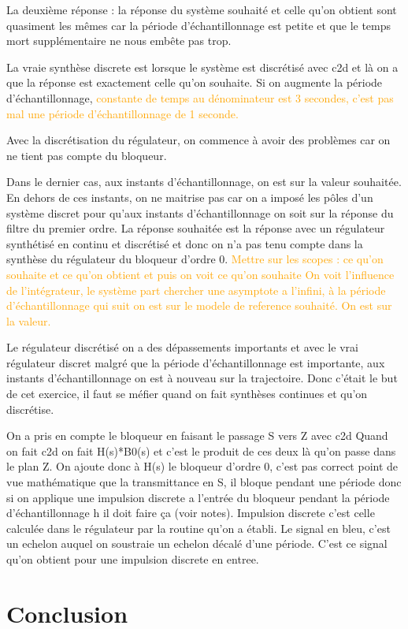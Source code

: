 La deuxième réponse : la réponse du système souhaité et celle qu’on obtient sont quasiment les mêmes car la période d’échantillonnage est petite et que le temps mort supplémentaire ne nous embête pas trop.

La vraie synthèse discrete est lorsque le système est discrétisé avec c2d et là on a que la réponse est exactement celle qu’on souhaite. Si on augmente la période d’échantillonnage, \textcolor{orange}{constante de temps au dénominateur est 3 secondes, c’est pas mal une période d’échantillonnage de 1 seconde.}

Avec la discrétisation du régulateur, on commence à avoir des problèmes car on ne tient pas compte du bloqueur.

Dans le dernier cas, aux instants d’échantillonnage, on est sur la valeur souhaitée. En dehors de ces instants, on ne maitrise pas car on a imposé les pôles d’un système discret pour qu’aux instants d’échantillonnage on soit sur la réponse du filtre du premier ordre.
La réponse souhaitée est la réponse avec un régulateur synthétisé en continu et discrétisé et donc on n'a pas tenu compte dans la synthèse du régulateur du bloqueur d’ordre 0.
\textcolor{orange}{Mettre sur les scopes : ce qu’on souhaite et ce qu’on obtient et puis on voit ce qu’on souhaite
On voit l’influence de l’intégrateur, le système part chercher une asymptote a l’infini, à la période d’échantillonnage qui suit on est sur le modele de reference souhaité. On est sur la valeur.}

Le régulateur discrétisé on a des dépassements importants et avec le vrai régulateur discret malgré que la période d’échantillonnage est importante, aux instants d’échantillonnage on est à nouveau sur la trajectoire. Donc c’était le but de cet exercice, il faut se méfier quand on fait synthèses continues et qu’on discrétise.

On a pris en compte le bloqueur en faisant le passage S vers Z avec c2d
Quand on fait c2d on fait H(s)*B0(s) et c’est le produit de ces deux là qu’on passe dans le plan Z. On ajoute donc à H(s) le bloqueur d’ordre 0, c’est pas correct point de vue mathématique que la transmittance en S, il bloque pendant une période donc si on applique une impulsion discrete a l’entrée du bloqueur pendant la période d’échantillonnage h il doit faire ça (voir notes). Impulsion discrete c’est celle calculée dans le régulateur par la routine qu’on a établi. Le signal en bleu, c’est un echelon auquel on soustraie un echelon décalé d’une période. C’est ce signal qu’on obtient pour une impulsion discrete en entree.

\section{Conclusion}

